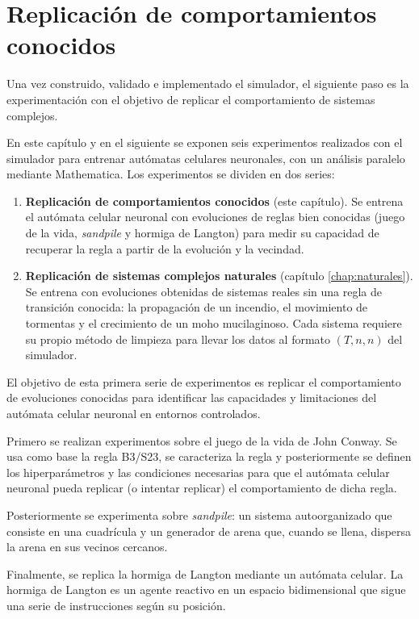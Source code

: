\chapter{Replicación de comportamientos conocidos}

Una vez construido, validado e implementado el simulador, el siguiente paso es la experimentación con el objetivo de replicar el comportamiento de sistemas complejos. 

En este capítulo y en el siguiente se exponen seis experimentos realizados con el simulador para entrenar autómatas celulares neuronales, con un análisis paralelo mediante Mathematica. Los experimentos se dividen en dos series:

\begin{enumerate}
	\item \textbf{Replicación de comportamientos conocidos} (este capítulo). Se entrena el autómata celular neuronal con evoluciones de reglas bien conocidas (juego de la vida, \textit{sandpile} y hormiga de Langton) para medir su capacidad de recuperar la regla a partir de la evolución y la vecindad.
	\item \textbf{Replicación de sistemas complejos naturales} (capítulo \ref{chap:naturales}). Se entrena con evoluciones obtenidas de sistemas reales sin una regla de transición conocida: la propagación de un incendio, el movimiento de tormentas y el crecimiento de un moho mucilaginoso. Cada sistema requiere su propio método de limpieza para llevar los datos al formato $(T, n, n)$ del simulador.
\end{enumerate}

El objetivo de esta primera serie de experimentos es replicar el comportamiento de evoluciones conocidas para identificar las capacidades y limitaciones del autómata celular neuronal en entornos controlados. 

Primero se realizan experimentos sobre el juego de la vida de John Conway. Se usa como base la regla B3/S23, se caracteriza la regla y posteriormente se definen los hiperparámetros y las condiciones necesarias para que el autómata celular neuronal pueda replicar (o intentar replicar) el comportamiento de dicha regla. 

Posteriormente se experimenta sobre \textit{sandpile}: un sistema autoorganizado que consiste en una cuadrícula y un generador de arena que, cuando se llena, dispersa la arena en sus vecinos cercanos. 

Finalmente, se replica la hormiga de Langton mediante un autómata celular. La hormiga de Langton es un agente reactivo en un espacio bidimensional que sigue una serie de instrucciones según su posición.
